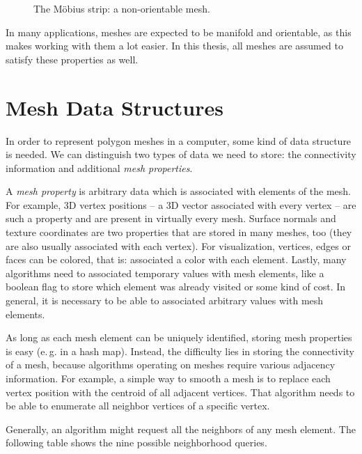 \begin{figure}[t]
  \centering
  
  \caption{The Möbius strip: a non-orientable mesh.}
  \label{fig:moebius}
\end{figure}


In many applications, meshes are expected to be manifold and orientable, as this makes working with them a lot easier.
In this thesis, all meshes are assumed to satisfy these properties as well.


\section{Mesh Data Structures}

In order to represent polygon meshes in a computer, some kind of data structure is needed.
We can distinguish two types of data we need to store: the connectivity information and additional \emph{mesh properties}.

A \emph{mesh property} is arbitrary data which is associated with elements of the mesh.
For example, 3D vertex positions -- a 3D vector associated with every vertex -- are such a property and are present in virtually every mesh.
Surface normals and texture coordinates are two properties that are stored in many meshes, too (they are also usually associated with each vertex).
For visualization, vertices, edges or faces can be colored, that is: associated a color with each element.
Lastly, many algorithms need to associated temporary values with mesh elements, like a boolean flag to store which element was already visited or some kind of cost.
In general, it is necessary to be able to associated arbitrary values with mesh elements.

As long as each mesh element can be uniquely identified, storing mesh properties is easy (e.\,g. in a hash map).
Instead, the difficulty lies in storing the connectivity of a mesh, because algorithms operating on meshes require various adjacency information.
For example, a simple way to smooth a mesh is to replace each vertex position with the centroid of all adjacent vertices.
That algorithm needs to be able to enumerate all neighbor vertices of a specific vertex.

Generally, an algorithm might request all the neighbors of any mesh element. The following table shows the nine possible neighborhood queries.

